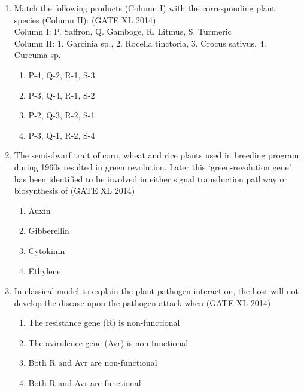 \documentclass[journal,12pt,onecolumn]{IEEEtran}
\theoremstyle{remark}
\begin{document}
\begin{enumerate}
\item Match the following products (Column I) with the corresponding plant species (Column II): \hfill(GATE XL 2014)\\
Column I: P. Saffron, Q. Gamboge, R. Litmus, S. Turmeric\\
Column II: 1. Garcinia sp., 2. Rocella tinctoria, 3. Crocus sativus, 4. Curcuma sp.\\
\begin{multicols}{2}
\begin{enumerate}
\item P-4, Q-2, R-1, S-3
\item P-3, Q-4, R-1, S-2
\item P-2, Q-3, R-2, S-1
\item P-3, Q-1, R-2, S-4
\end{enumerate}
\end{multicols}

\item The semi-dwarf trait of corn, wheat and rice plants used in breeding program during 1960s resulted in green revolution. Later this ‘green-revolution gene’ has been identified to be involved in either signal transduction pathway or biosynthesis of \hfill(GATE XL 2014)\\
\begin{multicols}{2}
\begin{enumerate}
\item Auxin
\item Gibberellin
\item Cytokinin
\item Ethylene
\end{enumerate}
\end{multicols}

\item In classical model to explain the plant-pathogen interaction, the host will not develop the disease upon the pathogen attack when \hfill(GATE XL 2014)\\
\begin{multicols}{2}
\begin{enumerate}
\item The resistance gene (R) is non-functional
\item The avirulence gene (Avr) is non-functional
\item Both R and Avr are non-functional
\item Both R and Avr are functional
\end{enumerate}
\end{multicols}


\end{enumerate}
\end{document}
